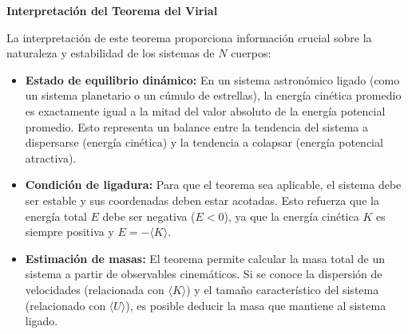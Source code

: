 \documentclass[12pt, letterpaper]{article}
\begin{document}
\textbf{Interpretación del Teorema del Virial}

La interpretación de este teorema proporciona información crucial sobre la naturaleza y estabilidad de los sistemas de $N$ cuerpos:

\begin{itemize}
    \item \textbf{Estado de equilibrio dinámico:} En un sistema astronómico ligado (como un sistema planetario o un cúmulo de estrellas), la energía cinética promedio es exactamente igual a la mitad del valor absoluto de la energía potencial promedio. Esto representa un balance entre la tendencia del sistema a dispersarse (energía cinética) y la tendencia a colapsar (energía potencial atractiva).
    \item \textbf{Condición de ligadura:} Para que el teorema sea aplicable, el sistema debe ser estable y sus coordenadas deben estar acotadas. Esto refuerza que la energía total $E$ debe ser negativa ($E < 0$), ya que la energía cinética $K$ es siempre positiva y $E = -\langle K \rangle$.
    \item \textbf{Estimación de masas:} El teorema permite calcular la masa total de un sistema a partir de observables cinemáticos. Si se conoce la dispersión de velocidades (relacionada con $\langle K \rangle$) y el tamaño característico del sistema (relacionado con $\langle U \rangle$), es posible deducir la masa que mantiene al sistema ligado.
\end{itemize}
\end{document}
